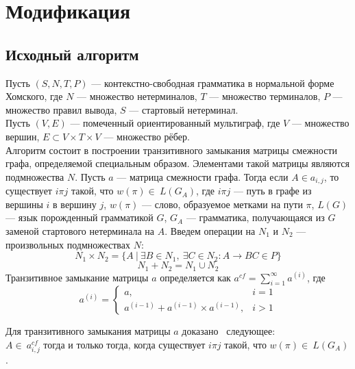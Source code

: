 \documentclass[14pt]{matmex-diploma}
\theoremstyle{definition}
\begin{document}
\section{Модификация}
    \subsection{Исходный алгоритм}
        Пусть $(S, N,T,P)$ --- контекстно-свободная грамматика в нормальной форме Хомского, где $N$ --- множество нетерминалов, $T$ --- множество терминалов, $P$ --- множество правил вывода, $S$ --- стартовый нетерминал.\\
        Пусть $(V,E)$ --- помеченный ориентированный мультиграф, где $V$ --- множество вершин, $E \subset V \times T \times V$ --- множество рёбер.\\
        Алгоритм состоит в построении транзитивного замыкания матрицы смежности графа, определяемой специальным образом.
        Элементами такой матрицы являются подмножества $N$. Пусть $a$ --- матрица смежности графа. Тогда если $A\in a_{i,j}$, то существует $i\pi j$ такой, что $w(\pi)\in~L(G_A)$, где $i\pi j$ --- путь в графе из вершины $i$ в вершину $j$, $w(\pi)$ --- слово, образуемое метками на пути $\pi$, $L(G)$ --- язык порожденный грамматикой $G$, $G_A$ --- грамматика, получающаяся из $G$ заменой стартового нетерминала на $A$.
        Введем операции на $N_1$ и $N_2$ --- произвольных подмножествах $N$:
        \begin{equation*}
            N_1 \times N_2 = \{A~|~\exists B \in N_1,~\exists C \in N_2 : A \rightarrow BC \in P\}
        \end{equation*}
        \begin{equation*}
            N_1 + N_2 = N_1 \cup N_2
        \end{equation*}
        Транзитивное замыкание матрицы $a$ определяется как $a^{cf} = \sum\limits_{i=1}^\infty a^{(i)}$, 
        где 
        \begin{equation*}
            a^{(i)} = 
            \begin{cases} 
                a,                                     & i=1\\
                a^{(i-1)} + a^{(i-1)}\times a^{(i-1)}, & i>1
            \end{cases}
        \end{equation*}

        
        Для транзитивного замыкания матрицы $a$ доказано~\cite{DBLP:journals/corr/AzimovG17} следующее:\\
        $A\in~a^{cf}_{i,j}$ тогда и только тогда, когда существует $i\pi j$ такой, что $w(\pi)\in~L(G_A)$.
        
\end{document}

